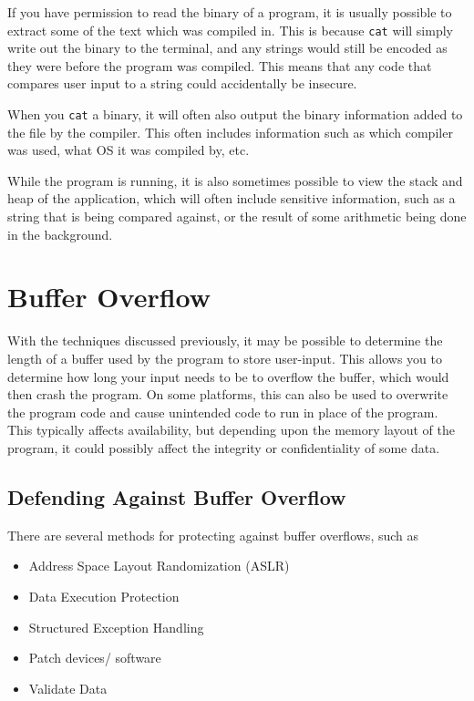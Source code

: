 
If you have permission to read the binary of a program, it is usually possible to extract some of the text which was
 compiled in. This is because \verb`cat` will simply write out the binary to the terminal, and any strings would still
 be encoded as they were before the program was compiled. This means that any code that compares user input to a string
 could accidentally be insecure.

When you \verb`cat` a binary, it will often also output the binary information added to the file by the compiler. This
 often includes information such as which compiler was used, what OS it was compiled by, etc.

While the program is running, it is also sometimes possible to view the stack and heap of the application, which will
 often include sensitive information, such as a string that is being compared against, or the result of some arithmetic
 being done in the background.

\section*{Buffer Overflow}

With the techniques discussed previously, it may be possible to determine the length of a buffer used by the program to
 store user-input. This allows you to determine how long your input needs to be to overflow the buffer, which would then
 crash the program. On some platforms, this can also be used to overwrite the program code and cause unintended code to
 run in place of the program. This typically affects availability, but depending upon the memory layout of the program,
 it could possibly affect the integrity or confidentiality of some data.

\subsection*{Defending Against Buffer Overflow}

There are several methods for protecting against buffer overflows, such as
\begin{itemize}
  \item Address Space Layout Randomization (ASLR)
  \item Data Execution Protection
  \item Structured Exception Handling
  \item Patch devices/ software
  \item Validate Data
\end{itemize}